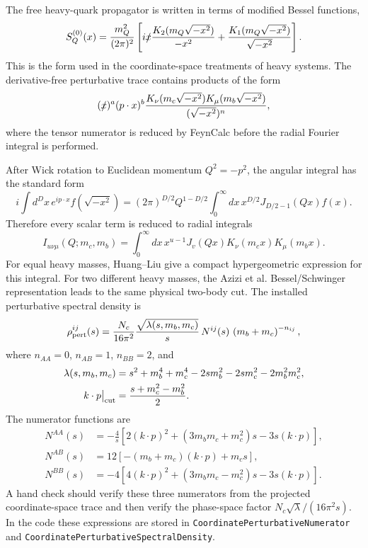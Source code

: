\documentclass[11pt]{article}
\begin{document}
The free heavy-quark propagator is written in terms of modified Bessel
functions,
\begin{equation}
  S_Q^{(0)}(x)
  =
  \frac{m_Q^2}{(2\pi)^2}
  \left[
    i\slashed{x}
    \frac{K_2(m_Q\sqrt{-x^2})}{-x^2}
    +
    \frac{K_1(m_Q\sqrt{-x^2})}{\sqrt{-x^2}}
  \right].
\end{equation}
This is the form used in the coordinate-space treatments of heavy systems.
The derivative-free perturbative trace contains products of the form
\begin{equation}
  (\slashed{x})^a (p\cdot x)^b
  \frac{K_\nu(m_c\sqrt{-x^2})K_\mu(m_b\sqrt{-x^2})}
       {(\sqrt{-x^2})^n},
\end{equation}
where the tensor numerator is reduced by FeynCalc before the radial Fourier
integral is performed.

After Wick rotation to Euclidean momentum \(Q^2=-p^2\), the angular integral
has the standard form
\begin{equation}
  i\int d^Dx\,e^{ip\cdot x}f(\sqrt{-x^2})
  =
  (2\pi)^{D/2}Q^{1-D/2}
  \int_0^\infty dx\,x^{D/2}J_{D/2-1}(Qx)f(x).
\end{equation}
Therefore every scalar term is reduced to radial integrals
\begin{equation}
  I_{u\nu\mu}(Q;m_c,m_b)
  =
  \int_0^\infty dx\,x^{u-1}
  J_v(Qx)K_\nu(m_cx)K_\mu(m_bx).
\end{equation}
For equal heavy masses, Huang--Liu give a compact hypergeometric expression
for this integral.  For two different heavy masses, the Azizi et al.
Bessel/Schwinger representation leads to the same physical two-body cut.  The
installed perturbative spectral density is
\begin{equation}
  \rho_{\rm pert}^{ij}(s)
  =
  \frac{N_c}{16\pi^2}
  \frac{\sqrt{\lambda(s,m_b,m_c)}}{s}\,
  N^{ij}(s)\,
  \left(m_b+m_c\right)^{-n_{ij}},
\end{equation}
where \(n_{AA}=0\), \(n_{AB}=1\), \(n_{BB}=2\), and
\begin{align}
  \lambda(s,m_b,m_c)
  &=
  s^2+m_b^4+m_c^4
  -2sm_b^2-2sm_c^2-2m_b^2m_c^2,\\
  k\cdot p\big|_{\rm cut}
  &=
  \frac{s+m_c^2-m_b^2}{2}.
\end{align}
The numerator functions are
\begin{align}
  N^{AA}(s)
  &=
  -\frac{4}{s}
  \left[
    2(k\cdot p)^2
    +(3m_bm_c+m_c^2)s
    -3s(k\cdot p)
  \right],
  \\
  N^{AB}(s)
  &=
  12\left[-(m_b+m_c)(k\cdot p)+m_cs\right],
  \\
  N^{BB}(s)
  &=
  -4
  \left[
    4(k\cdot p)^2
    +(3m_bm_c-m_c^2)s
    -3s(k\cdot p)
  \right].
\end{align}
A hand check should verify these three numerators from the projected
coordinate-space trace and then verify the phase-space factor
\(N_c\sqrt{\lambda}/(16\pi^2s)\).  In the code these expressions are stored in
\texttt{CoordinatePerturbativeNumerator} and
\texttt{CoordinatePerturbativeSpectralDensity}.
\end{document}
